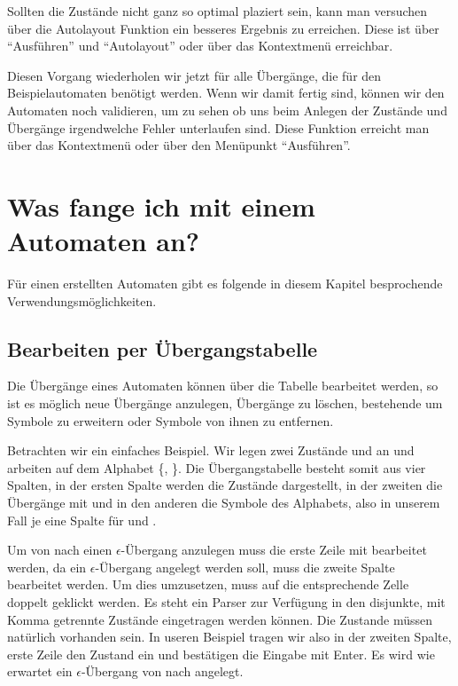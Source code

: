 Sollten die Zustände nicht ganz so optimal plaziert sein, kann man
versuchen über die Autolayout Funktion ein besseres Ergebnis zu
erreichen. Diese ist über "`Ausführen"' und "`Autolayout"' oder über
das Kontextmenü erreichbar.\vspace{10pt}

Diesen Vorgang wiederholen wir jetzt für alle Übergänge, die
für den Beispielautomaten benötigt werden. Wenn wir damit fertig sind, können
wir den Automaten noch validieren, um zu sehen ob uns beim Anlegen der Zustände
und Übergänge irgendwelche Fehler unterlaufen sind. Diese Funktion erreicht man
über das Kontextmenü oder über den Menüpunkt "`Ausführen"'.

\section{Was fange ich mit einem Automaten an?}

Für einen erstellten Automaten gibt es folgende in diesem Kapitel besprochende
Ver\-wen\-dungs\-möglich\-keiten.


\subsection{Bearbeiten per Übergangstabelle}

Die Übergänge eines Automaten können über die Tabelle bearbeitet werden, so ist
es möglich neue Übergänge anzulegen, Übergänge zu löschen, bestehende um
Symbole zu erweitern oder Symbole von ihnen zu entfernen.\vspace{10pt}

Betrachten wir ein einfaches Beispiel. Wir legen zwei Zustände  und
 an und arbeiten auf dem Alphabet \{, \}. Die
Übergangstabelle besteht somit aus vier Spalten, in der ersten Spalte werden die
Zustände dargestellt, in der zweiten die Übergänge mit \Symbol{$\epsilon$} und in
den anderen die Symbole des Alphabets, also in unserem Fall je eine Spalte für
 und .\vspace{10pt}

Um von  nach  einen $\epsilon$-Übergang anzulegen muss die
erste Zeile mit  bearbeitet werden, da ein $\epsilon$-Übergang
angelegt werden soll, muss die zweite Spalte bearbeitet werden. Um dies
umzusetzen, muss auf die entsprechende Zelle doppelt geklickt werden. Es steht
ein Parser zur Verfügung in den disjunkte, mit Komma getrennte Zustände eingetragen
werden können. Die Zustande müssen natürlich vorhanden sein. In useren Beispiel
tragen wir also in der zweiten Spalte, erste Zeile den Zustand  ein
und bestätigen die Eingabe mit Enter. Es wird wie erwartet ein
$\epsilon$-Übergang von  nach  angelegt.\vspace{10pt}

